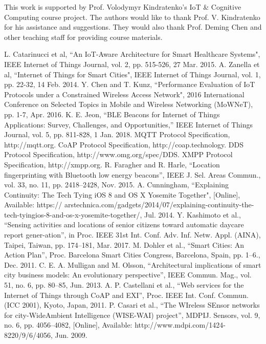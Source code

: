 \documentclass[conference]{IEEEtran}
\begin{document}
This work is supported by Prof. Volodymyr Kindratenko's IoT \& Cognitive Computing course project. The authors would like to thank Prof. V. Kindratenko for his assistance and suggestions. They would also thank Prof. Deming Chen and other teaching staff for providing course materials.

\begin{thebibliography}{00}
 L. Catarinucci et al, ``An IoT-Aware Architecture for Smart
Healthcare Systems", IEEE Internet of Things Journal, vol. 2, pp. 515-526, 27 Mar. 2015.
 A. Zanella et al, ``Internet of Things for Smart Cities", IEEE Internet of Things Journal, vol. 1, pp. 22-32, 14 Feb. 2014.
 Y. Chen and T. Kunz, ``Performance Evaluation of IoT Protocols under a Constrained Wireless Access Network", 2016 International Conference on Selected Topics in Mobile and Wireless Networking (MoWNeT), pp. 1-7, Apr. 2016.
 K. E. Jeon, ``BLE Beacons for Internet of Things Applications: Survey, Challenges, and Opportunities,'' IEEE Internet of Things Journal, vol. 5, pp. 811-828, 1 Jan. 2018.
 MQTT Protocol Specification, http://mqtt.org. 
 CoAP Protocol Specification, http://coap.technology.
 DDS Protocol Specification, http://www.omg.org/spec/DDS. 
 XMPP Protocol Specification, http://xmpp.org.
 R. Faragher and R. Harle, “Location fingerprinting with Bluetooth low energy beacons”, IEEE J. Sel. Areas Commun., vol. 33, no. 11, pp. 2418–2428, Nov. 2015.
 A. Cunningham, “Explaining Continuity: The Tech Tying iOS 8 and OS X Yosemite Together", [Online], Available: https:// arstechnica.com/gadgets/2014/07/explaining-continuity-the-tech-tyingios-8-and-os-x-yosemite-together/, Jul. 2014.
 Y. Kashimoto et al., “Sensing activities and locations of senior citizens toward automatic daycare report gener-ation”, in Proc. IEEE 31st Int. Conf. Adv. Inf. Netw. Appl. (AINA), Taipei, Taiwan, pp. 174–181, Mar. 2017.
 M. Dohler et al., “Smart Cities: An Action Plan”, Proc. Barcelona Smart Cities Congress, Barcelona, Spain, pp. 1–6., Dec. 2011.
 C. E. A. Mulligan and M. Olsson, “Architectural implications of smart city business models: An evolutionary perspective”, IEEE Commun. Mag., vol. 51, no. 6, pp. 80–85, Jun. 2013.
 A. P. Castellani et al., “Web services for the Internet of Things through CoAP and EXI”, Proc. IEEE Int. Conf. Commun. (ICC 2001), Kyoto, Japan, 2011.
 P. Casari et al., “The WIreless SEnsor networks for city-WideAmbient Intelligence (WISE-WAI) project”, MDPIJ. Sensors, vol. 9, no. 6, pp. 4056–4082, [Online], Available: http://www.mdpi.com/1424-8220/9/6/4056, Jun. 2009.

\end{thebibliography}
\end{document}
